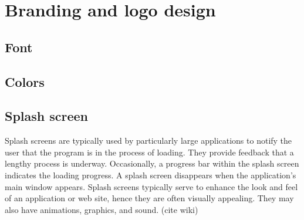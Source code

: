 \documentclass[oneside]{memoir}
\begin{document}
\begin{tabularx}{\textwidth}{llX}
 

\bottomrule          
\end{tabularx}   

\section{Branding and logo design}

\subsection{Font}

\subsection{Colors}

\subsection{Splash screen}

Splash screens are typically used by particularly large applications to notify
the user that the program is in the process of loading. They provide feedback
that a lengthy process is underway. Occasionally, a progress bar within the
splash screen indicates the loading progress. A splash screen disappears when
the application's main window appears. Splash screens typically serve to enhance
the look and feel of an application or web site, hence they are often visually
appealing. They may also have animations, graphics, and sound. (cite wiki)
\end{document}
